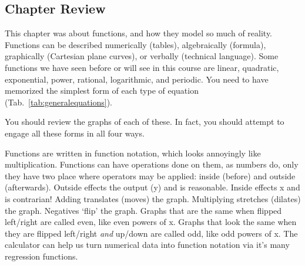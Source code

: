 \subsection{Chapter Review}
This chapter was about functions, and how they model so much of reality.  Functions can be
described numerically (tables), algebraically (formula), graphically (Cartesian plane curves), or
verbally (technical language).  Some functions we have seen before or will see in this course
are linear, quadratic, exponential, power, rational, logarithmic, and periodic.
You need to have memorized the simplest form of each type of equation (Tab.~\ref{tab:generalequations}).



You should review the graphs of each of these.  In fact, you should attempt to engage all
these forms in all four ways.

Functions are written in function notation, which looks annoyingly like multiplication.
Functions can have operations done on them, as numbers do, only they have two place where
operators may be applied: inside (before) and outside (afterwards).  Outside effects the output
(y) and is reasonable.  Inside effects x and is contrarian!  Adding translates (moves) the graph.
Multiplying stretches (dilates) the graph.  Negatives `flip' the graph.  Graphs that are the same when flipped
left/right are called even, like even powers of x.  Graphs that look the same when they are
flipped left/right \emph{and} up/down are called odd, like odd powers of x.  The calculator can help us turn
numerical data into function notation via it's many regression functions.


